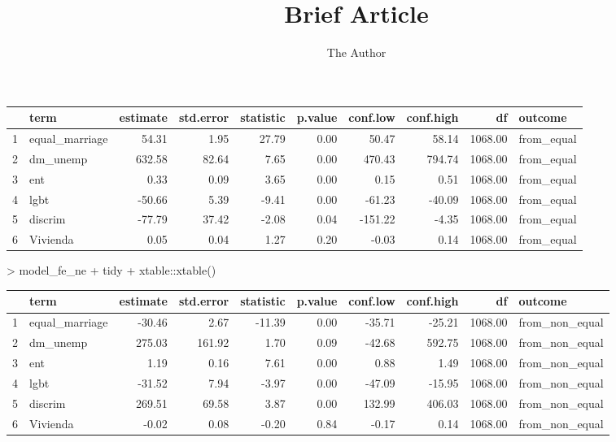 \documentclass[11pt, oneside]{article}   	%
\title{Brief Article}
\author{The Author}
\begin{document}
\maketitle

\begin{table}[ht]
    \centering
    \begin{tabular}{rlrrrrrrrl}
      \hline
     & term & estimate & std.error & statistic & p.value & conf.low & conf.high & df & outcome \\ 
      \hline
    1 & equal\_marriage & 54.31 & 1.95 & 27.79 & 0.00 & 50.47 & 58.14 & 1068.00 & from\_equal \\ 
      2 & dm\_unemp & 632.58 & 82.64 & 7.65 & 0.00 & 470.43 & 794.74 & 1068.00 & from\_equal \\ 
      3 & ent & 0.33 & 0.09 & 3.65 & 0.00 & 0.15 & 0.51 & 1068.00 & from\_equal \\ 
      4 & lgbt & -50.66 & 5.39 & -9.41 & 0.00 & -61.23 & -40.09 & 1068.00 & from\_equal \\ 
      5 & discrim & -77.79 & 37.42 & -2.08 & 0.04 & -151.22 & -4.35 & 1068.00 & from\_equal \\ 
      6 & Vivienda & 0.05 & 0.04 & 1.27 & 0.20 & -0.03 & 0.14 & 1068.00 & from\_equal \\ 
       \hline
    \end{tabular}
    \end{table}
    > model_fe_ne %
    +     tidy %
    +     xtable::xtable()
    \begin{table}[ht]
    \centering
    \begin{tabular}{rlrrrrrrrl}
      \hline
     & term & estimate & std.error & statistic & p.value & conf.low & conf.high & df & outcome \\ 
      \hline
    1 & equal\_marriage & -30.46 & 2.67 & -11.39 & 0.00 & -35.71 & -25.21 & 1068.00 & from\_non\_equal \\ 
      2 & dm\_unemp & 275.03 & 161.92 & 1.70 & 0.09 & -42.68 & 592.75 & 1068.00 & from\_non\_equal \\ 
      3 & ent & 1.19 & 0.16 & 7.61 & 0.00 & 0.88 & 1.49 & 1068.00 & from\_non\_equal \\ 
      4 & lgbt & -31.52 & 7.94 & -3.97 & 0.00 & -47.09 & -15.95 & 1068.00 & from\_non\_equal \\ 
      5 & discrim & 269.51 & 69.58 & 3.87 & 0.00 & 132.99 & 406.03 & 1068.00 & from\_non\_equal \\ 
      6 & Vivienda & -0.02 & 0.08 & -0.20 & 0.84 & -0.17 & 0.14 & 1068.00 & from\_non\_equal \\ 
       \hline
    \end{tabular}
\end{table}
\end{document}
